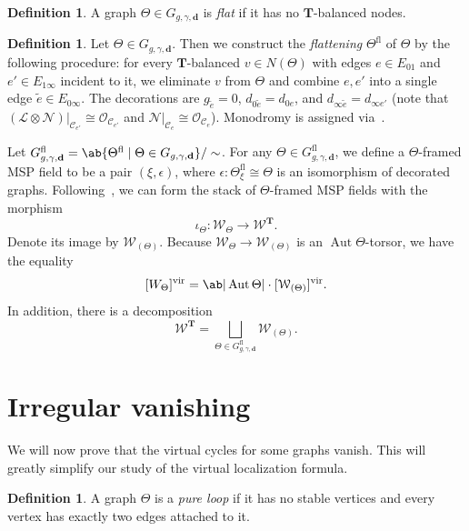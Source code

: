 \documentclass{amsart}
\theoremstyle{definition}
\newtheorem{defn}[thm]{Definition}
\theoremstyle{remark}
\theoremstyle{plain}
\theoremstyle{definition}
\theoremstyle{remark}
\newcommand{\T}{\mathbf{T}}
\newcommand{\mc}[1]{\mathcal{#1}}
\newcommand{\mbf}[1]{\mathbf{#1}}
\newcommand{\mr}[1]{\mathrm{#1}}
\newcommand{\wt}[1]{\widetilde{#1}}
\newcommand{\1}{\mathbf{1}}
\newcommand{\2}{\mathbf{2}}
\newcommand{\3}{\mathbf{3}}
\newcommand{\vir}{\mr{vir}}
\newcommand{\fl}{\mr{fl}}
\DeclareMathOperator{\Aut}{Aut}
\begin{document}
\begin{defn}
    A graph $\Theta \in G_{g,\gamma,\mbf{d}}$ is \textit{flat} if it has no $\T$-balanced nodes.
\end{defn}

\begin{defn}
    Let $\Theta \in G_{g,\gamma,\mbf{d}}$. Then we construct the \textit{flattening} $\Theta^{\mr{fl}}$ of $\Theta$ by the following procedure: for every $\T$-balanced $v \in N(\Theta)$ with edges $e \in E_{01}$ and $e' \in E_{1\infty}$ incident to it, we eliminate $v$ from $\Theta$ and combine $e, e'$ into a single edge $\wt{e} \in E_{0\infty}$. The decorations are $g_{\wt{e}} = 0$, $d_{0\wt{e}} = d_{0e}$, and $d_{\infty \wt{e}} = d_{\infty e'}$ (note that $(\mc{L} \otimes \mc{N})|_{\mc{C}_{e'}} \cong \mc{O}_{\mc{C}_{e'}}$ and $\mc{N}|_{\mc{C}_e} \cong \mc{O}_{\mc{C}_e}$). Monodromy is assigned via~.
\end{defn}

Let $G^{\fl}_{g,\gamma,\mbf{d}} = \ab\{\Theta^{\fl} \mid \Theta \in G_{g,\gamma,\mbf{d}}\}/\sim$. For any $\Theta \in G^{\fl}_{g,\gamma,\mbf{d}}$, we define a $\Theta$-framed MSP field to be a pair $(\xi, \epsilon)$, where $\epsilon \colon \Theta_{\xi}^{\fl} \cong \Theta$ is an isomorphism of decorated graphs. Following~\cite[\S 4.2]{nmsp}, we can form the stack of $\Theta$-framed MSP fields with the morphism
\[ \iota_{\Theta} \colon \mc{W}_{\Theta} \to \mc{W}^{\T}. \]
Denote its image by $\mc{W}_{(\Theta)}$. Because $\mc{W}_{\Theta} \to \mc{W}_{(\Theta)}$ is an $\Aut \Theta$-torsor, we have the equality
\[ [W_{\Theta}]^{\vir} = \ab|\Aut \Theta| \cdot [\mc{W}_{(\Theta)}]^{\vir}. \]
In addition, there is a decomposition
\[ \mc{W}^{\T} = \bigsqcup_{\Theta \in G_{g,\gamma,\mbf{d}}^{\mr{fl}}} \mc{W}_{(\Theta)}. \]

\section{Irregular vanishing}
\label{sec:irrvan}


We will now prove that the virtual cycles for some graphs vanish. This will greatly simplify our study of the virtual localization formula.

\begin{defn}
    A graph $\Theta$ is a \textit{pure loop} if it has no stable vertices and every vertex has exactly two edges attached to it.
\end{defn}
\end{document}
